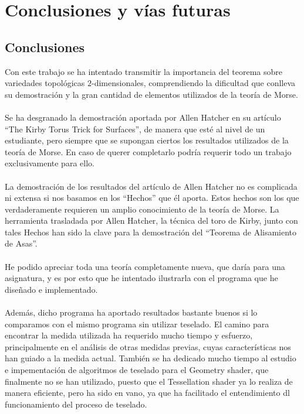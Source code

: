 %


\chapter*{Conclusiones y vías futuras}

\section*{Conclusiones}
Con este trabajo se ha intentado transmitir la importancia del teorema sobre variedades topológicas $2$-dimensionales, comprendiendo la dificultad que conlleva su demostración y la gran cantidad de elementos utilizados de la teoría de Morse.\\
\\Se ha desgranado la demostración aportada por Allen Hatcher en su artículo ``The Kirby Torus Trick for Surfaces'', de manera que esté al nivel de un estudiante, pero siempre que se supongan ciertos los resultados utilizados de la teoría de Morse. En caso de querer completarlo podría requerir todo un trabajo exclusivamente para ello.\\
\\La demostración de los resultados del artículo de Allen Hatcher no es complicada ni extensa si nos basamos en los ``Hechos'' que él aporta. Estos hechos son los que verdaderamente requieren un amplio conocimiento de la teoría de Morse. La herramienta trasladada por Allen Hatcher, la técnica del toro de Kirby, junto con tales Hechos han sido la clave para la demostración del ``Teorema de Alisamiento de Asas''.\\
\\He podido apreciar toda una teoría completamente nueva, que daría para una asignatura, y es por esto que he intentado ilustrarla con el programa que he diseñado e implementado.\\
\\Además, dicho programa ha aportado resultados bastante buenos si lo comparamos con el mismo programa sin utilizar teselado. El camino para encontrar la medida utilizada ha requerido mucho tiempo y esfuerzo, principalmente en el análisis de otras medidas previas, cuyas características nos han guiado a la medida actual. También se ha dedicado mucho tiempo al estudio e impementación de algoritmos de teselado para el Geometry shader, que finalmente no se han utilizado, puesto que el Tessellation shader ya lo realiza de manera eficiente, pero ha sido en vano, ya que ha facilitado el entendimiento dl funcionamiento del proceso de teselado.\\
